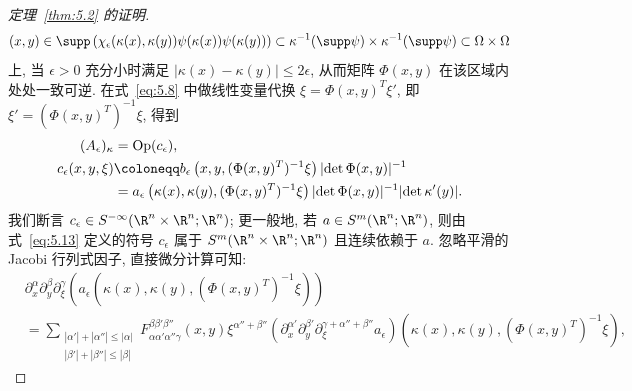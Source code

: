 \begin{proof}[定理~\ref{thm:5.2} 的证明]
\begin{equation}
    (x, y) \in \supp\left( \chi_\epsilon(\kappa(x), \kappa(y)) \psi(\kappa(x)) \psi(\kappa(y)) \right) \subset \kappa^{-1}(\supp\psi) \times \kappa^{-1}(\supp\psi) \subset \Omega \times \Omega
\end{equation}
上, 当 $\epsilon > 0$ 充分小时满足 $|\kappa(x) - \kappa(y)| \le 2\epsilon$, 从而矩阵 $\Phi(x, y)$ 在该区域内处处一致可逆. 在式~\eqref{eq:5.8} 中做线性变量代换 $\xi = \Phi(x, y)^T \xi'$, 即 $\xi' = (\Phi(x, y)^T)^{-1} \xi$, 得到
\begin{equation}\label{eq:5.13}
    \begin{aligned}
        (A_\epsilon)_\kappa &= \Op(c_\epsilon), \\
        c_\epsilon(x, y, \xi) &\defeq b_\epsilon\left( x, y, (\Phi(x, y)^T)^{-1} \xi \right) |\!\det \Phi(x, y)|^{-1} \\
        &= a_\epsilon\left( \kappa(x), \kappa(y), (\Phi(x, y)^T)^{-1} \xi \right) |\!\det \Phi(x, y)|^{-1} |\!\det \kappa'(y)|.
    \end{aligned}
\end{equation}
我们断言 $c_\epsilon \in S^{-\infty}(\R^n \times \R^n; \R^n)$; 更一般地, 若 $a \in S^m(\R^n; \R^n)$, 则由式~\eqref{eq:5.13} 定义的符号 $c_\epsilon$ 属于 $S^m(\R^n \times \R^n; \R^n)$ 且连续依赖于 $a$. 忽略平滑的 Jacobi 行列式因子, 直接微分计算可知:
\begin{equation}\label{eq:5.14}
    \begin{aligned}
        &\partial_x^\alpha \partial_y^\beta \partial_\xi^\gamma \left( a_\epsilon\left( \kappa(x), \kappa(y), (\Phi(x, y)^T)^{-1} \xi \right) \right) \\
        &= \sum_{\substack{|\alpha'| + |\alpha''| \le |\alpha| \\ |\beta'| + |\beta''| \le |\beta|}} F_{\alpha \alpha' \alpha'' \gamma}^{\beta \beta' \beta''}(x, y) \xi^{\alpha'' + \beta''} (\partial_x^{\alpha'} \partial_y^{\beta'} \partial_\xi^{\gamma + \alpha'' + \beta''} a_\epsilon)\left( \kappa(x), \kappa(y), (\Phi(x, y)^T)^{-1} \xi \right),
    \end{aligned}
\end{equation}

\end{proof}
